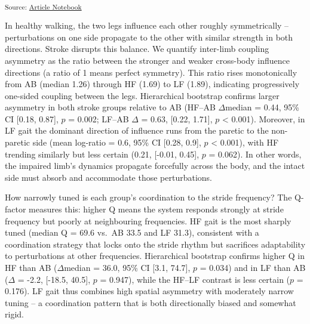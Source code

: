 \documentclass[
  letterpaper,
  DIV=11,
  numbers=noendperiod]{scrartcl}
\begin{document}
\textsubscript{Source:
\href{https://michaelhess17.github.io/Gait_NonNormality_Paper/index.qmd.html}{Article
Notebook}}

In healthy walking, the two legs influence each other roughly
symmetrically -- perturbations on one side propagate to the other with
similar strength in both directions. Stroke disrupts this balance. We
quantify inter-limb coupling asymmetry as the ratio between the stronger
and weaker cross-body influence directions (a ratio of 1 means perfect
symmetry). This ratio rises monotonically from AB (median 1.26) through
HF (1.69) to LF (1.89), indicating progressively one-sided coupling
between the legs. Hierarchical bootstrap confirms larger asymmetry in
both stroke groups relative to AB (HF--AB \(\Delta\)median = 0.44, 95\%
CI {[}0.18, 0.87{]}, \(p\) = 0.002; LF--AB \(\Delta\) = 0.63, {[}0.22,
1.71{]}, \(p\) \textless{} 0.001). Moreover, in LF gait the dominant
direction of influence runs from the paretic to the non-paretic side
(mean log-ratio = 0.6, 95\% CI {[}0.28, 0.9{]}, \(p\) \textless{}
0.001), with HF trending similarly but less certain (0.21, {[}-0.01,
0.45{]}, \(p\) = 0.062). In other words, the impaired limb's dynamics
propagate forcefully across the body, and the intact side must absorb
and accommodate those perturbations.

How narrowly tuned is each group's coordination to the stride frequency?
The Q-factor measures this: higher Q means the system responds strongly
at stride frequency but poorly at neighbouring frequencies. HF gait is
the most sharply tuned (median Q = 69.6 vs.~AB 33.5 and LF 31.3),
consistent with a coordination strategy that locks onto the stride
rhythm but sacrifices adaptability to perturbations at other
frequencies. Hierarchical bootstrap confirms higher Q in HF than AB
(\(\Delta\)median = 36.0, 95\% CI {[}3.1, 74.7{]}, \(p\) = 0.034) and in
LF than AB (\(\Delta\) = -2.2, {[}-18.5, 40.5{]}, \(p\) = 0.947), while
the HF--LF contrast is less certain (\(p\) = 0.176). LF gait thus
combines high spatial asymmetry with moderately narrow tuning -- a
coordination pattern that is both directionally biased and somewhat
rigid.
\end{document}
